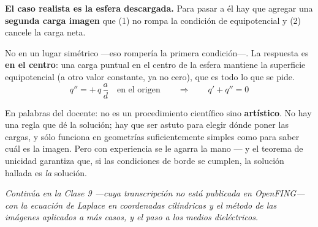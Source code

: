 \documentclass[12pt,a4paper]{article}
\begin{document}
\textbf{El caso realista es la esfera descargada.} Para pasar a él hay que agregar
una \textbf{segunda carga imagen} que (1) no rompa la condición de equipotencial y
(2) cancele la carga neta.

\begin{keybox}
No en un lugar simétrico ---eso rompería la primera condición---. La respuesta es
\textbf{en el centro}: una carga puntual en el centro de la esfera mantiene la
superficie equipotencial (a otro valor constante, ya no cero), que es todo lo que
se pide.
\[
q'' = +\,q\,\frac{a}{d} \quad\text{en el origen}
\qquad\Longrightarrow\qquad
q' + q'' = 0
\]
\end{keybox}

\begin{notebox}
En palabras del docente: no es un procedimiento científico sino
\textbf{artístico}. No hay una regla que dé la solución; hay que ser astuto para
elegir dónde poner las cargas, y sólo funciona en geometrías suficientemente
simples como para saber cuál es la imagen. Pero con experiencia se le agarra la
mano --- y el teorema de unicidad garantiza que, si las condiciones de borde se
cumplen, la solución hallada es \emph{la} solución.
\end{notebox}

\bigskip
\noindent\emph{Continúa en la Clase 9 ---cuya transcripción no está publicada en
OpenFING--- con la ecuación de Laplace en coordenadas cilíndricas y el método de
las imágenes aplicados a más casos, y el paso a los medios dieléctricos.}
\end{document}
